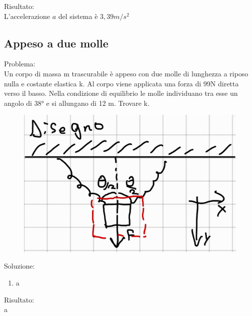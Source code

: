 \documentclass{article}
\begin{document}
\noindent Risultato:\\
L'accelerazione \(a\) del sistema è \(3,39 m/s^2\)
\subsection{Appeso a due molle}
Problema:\\
Un corpo di massa m trascurabile è appeso con due molle di lunghezza a riposo nulla e costante elastica k. Al corpo viene applicata una forza di 99N diretta verso il basso. Nella condizione di equilibrio le molle individuano tra esse un angolo di 38° e si allungano di 12 m. Trovare k.
\begin{figure}[ht]
    \centering
    \includegraphics[width=0.5\linewidth]{Immagini/appesotraduemolle.png}
\end{figure}

\noindent Soluzione:
\begin{enumerate}
    \item a
\end{enumerate}

\noindent Risultato:\\
a
\end{document}
